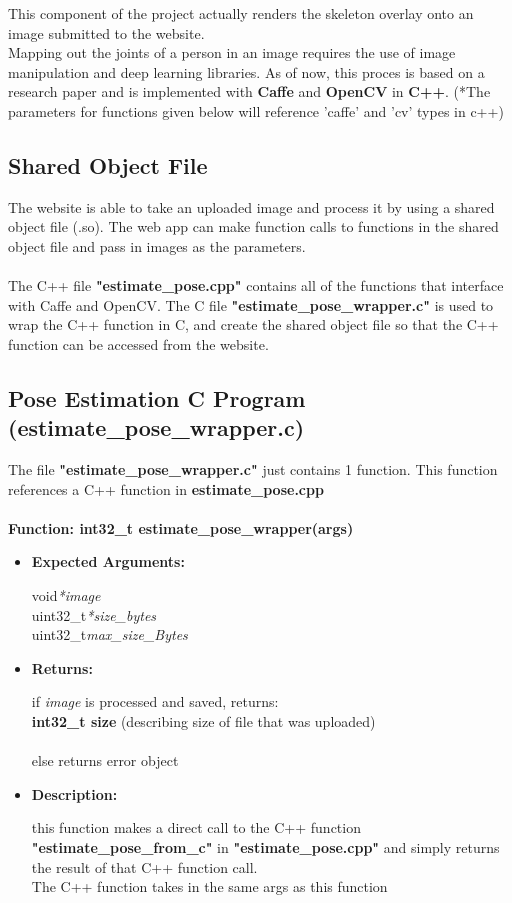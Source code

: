 \documentclass{scrreprt}
\begin{document}
This component of the project actually renders the skeleton overlay onto an image submitted to the website.
\\
Mapping out the joints of a person in an image requires the use of image manipulation and deep learning libraries. As of now, this proces is based on a research paper and is implemented with \textbf{Caffe} and \textbf{OpenCV} in \textbf{C++}. (*The parameters for functions given below will reference 'caffe' and 'cv' types in c++)


\subsection{Shared Object File}

The website is able to take an uploaded image and process it by using a shared object file (.so). The web app can make function calls to functions in the shared object file and pass in images as the parameters.
\\\\
The C++ file \textbf{"estimate\_pose.cpp"} contains all of the functions that interface with Caffe and OpenCV. The C file \textbf{"estimate\_pose\_wrapper.c"} is used to wrap the C++ function in C, and create the shared object file so that the C++ function can be accessed from the website.

\subsection{Pose Estimation C Program (estimate\_pose\_wrapper.c)}
The file \textbf{"estimate\_pose\_wrapper.c"} just contains 1 function. This function references a C++ function in \textbf{estimate\_pose.cpp}
\\\\
\textbf{Function: int32\_t estimate\_pose\_wrapper(args)}
\begin{itemize}
    \item \textbf{Expected Arguments:}

    void\quad\textit{*image}
    \\
    uint32\_t\quad\textit{*size\_bytes}
    \\
    uint32\_t\quad\textit{max\_size\_Bytes}

    \item\quad\textbf{Returns:}

    if \textit{image} is processed and saved, returns:\\\textbf{int32\_t size}
    (describing size of file that was uploaded)
    \\\\
    else returns error object

    \item \textbf{Description:}

    this function makes a direct call to the C++ function \textbf{"estimate\_pose\_from\_c"} in \textbf{"estimate\_pose.cpp"} and simply returns the result of that C++ function call.
    \\
    The C++ function takes in the same args as this function
\end{itemize}
\end{document}
